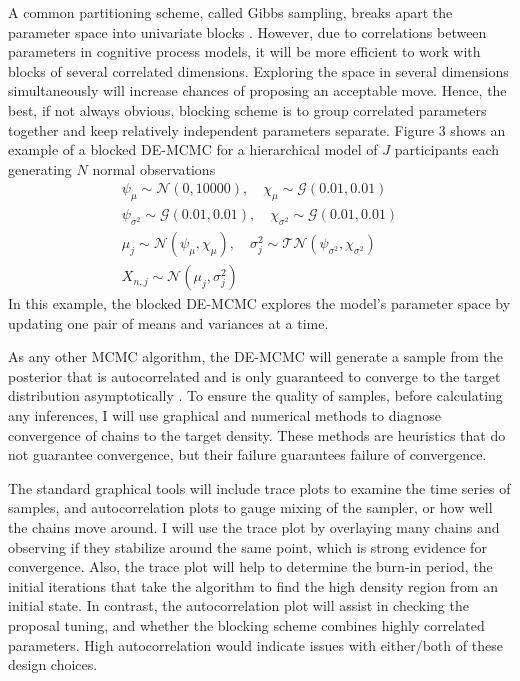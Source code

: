 \documentclass[12pt]{article}
\begin{document}
    A common partitioning scheme, called Gibbs sampling, breaks apart the parameter space into univariate blocks \citep{RobCas2004,GamLop2006,GelCar2013}. However, due to correlations between parameters in cognitive process models, it will be more efficient to work with blocks of several correlated dimensions. Exploring the space in several dimensions simultaneously will increase chances of proposing an acceptable move. Hence, the best, if not always obvious, blocking scheme is to group correlated parameters together and keep relatively independent parameters separate. Figure $3$ shows an example of a blocked DE-MCMC for a hierarchical model of $J$ participants each generating $N$ normal observations 
\begin{gather}
\psi_{\mu} \sim \mathcal{N}(0, 10000), \quad 
\chi_{\mu} \sim \mathcal{G}(0.01,0.01) \nonumber \\
\psi_{\sigma^2} \sim \mathcal{G}(0.01, 0.01), 
\quad \chi_{\sigma^2} \sim \mathcal{G}(0.01,0.01) \nonumber \\
\mu_j \sim \mathcal{N}(\psi_{\mu}, \chi_{\mu}), 
\quad \sigma_j^2 \sim \mathcal{TN}(\psi_{\sigma^2}, \chi_{\sigma^2}) \nonumber \\
X_{n, j} \sim \mathcal{N}(\mu_j, \sigma_j^2) \nonumber
\end{gather}
In this example, the blocked DE-MCMC explores the model’s parameter space by updating one pair of means and variances at a time.

	As any other MCMC algorithm, the DE-MCMC will generate a sample from the posterior that is autocorrelated and is only guaranteed to converge to the target distribution asymptotically \citep{RobCas2004,GamLop2006}. To ensure the quality of samples, before calculating any inferences, I will use graphical and numerical methods to diagnose convergence of chains to the target density. These methods are heuristics that do not guarantee convergence, but their failure guarantees failure of convergence.
    
    The standard graphical tools will include trace plots to examine the time series of samples, and autocorrelation plots to gauge mixing of the sampler, or how well the chains move around. I will use the trace plot by overlaying many chains and observing if they stabilize around the same point, which is strong evidence for convergence. Also, the trace plot will help to determine the burn-in period, the initial iterations that take the algorithm to find the high density region from an initial state. In contrast, the autocorrelation plot will assist in checking the proposal tuning, and whether the blocking scheme combines highly correlated parameters. High autocorrelation would indicate issues with either/both of these design choices.
\end{document}

